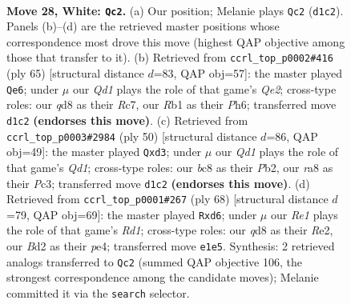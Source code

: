 \documentclass[11pt]{article}
\begin{document}
\clearpage

\begin{figure}[p]\centering
\begin{subfigure}{0.46\textwidth}\centering
\resizebox{\linewidth}{!}{%
\newchessgame
\chessboard[
  setfen={r1bq2k1/8/8/2p1pr1p/7P/p1P3P1/P2B4/1R1QR1K1 w - - 1 28},
  showmover=false,
  pgfstyle=straightmove, color=movearrow, markmove={d1-c2}
]}
\caption{}
\end{subfigure}\hfill
\begin{subfigure}{0.46\textwidth}\centering
\resizebox{\linewidth}{!}{%
\newchessgame
\chessboard[
  setfen={8/2r1qr1k/1p5p/4pp2/1PP1p3/1Q4P1/4P2P/2R2R1K b - - 1 33},
  showmover=false,
  pgfstyle=straightmove, color=movearrow, markmove={e7-e6}
]}
\caption{}
\end{subfigure}
\\[4pt]
\begin{subfigure}{0.46\textwidth}\centering
\resizebox{\linewidth}{!}{%
\newchessgame
\chessboard[
  setfen={r5k1/4q3/p1bp2p1/1p6/7P/P1PpB3/1P3P2/2RQK3 w - - 0 26},
  showmover=false,
  pgfstyle=straightmove, color=movearrow, markmove={d1-d3}
]}
\caption{}
\end{subfigure}\hfill
\begin{subfigure}{0.46\textwidth}\centering
\resizebox{\linewidth}{!}{%
\newchessgame
\chessboard[
  setfen={4qr1k/6p1/1rbp3p/8/2B1p3/7P/2Q1RPP1/3R2K1 w - - 0 35},
  showmover=false,
  pgfstyle=straightmove, color=movearrow, markmove={d1-d6}
]}
\caption{}
\end{subfigure}
\caption{\textbf{Move 28, White: \texttt{Qc2}.} (a) Our position; Melanie plays \texttt{Qc2} (\texttt{d1c2}). Panels (b)--(d) are the retrieved master positions whose correspondence most drove this move (highest QAP objective among those that transfer to it). (b) Retrieved from \texttt{ccrl\_top\_p0002\#416} (ply 65) [structural distance $d$=83, QAP obj=57]: the master played \texttt{Qe6}; under $\mu$ our \emph{Qd1} plays the role of that game's \emph{Qe2}; cross-type roles: our \emph{q}d8 as their \emph{R}c7, our \emph{R}b1 as their \emph{P}h6; transferred move \texttt{d1c2} \textbf{(endorses this move)}. (c) Retrieved from \texttt{ccrl\_top\_p0003\#2984} (ply 50) [structural distance $d$=86, QAP obj=49]: the master played \texttt{Qxd3}; under $\mu$ our \emph{Qd1} plays the role of that game's \emph{Qd1}; cross-type roles: our \emph{b}c8 as their \emph{P}b2, our \emph{r}a8 as their \emph{P}c3; transferred move \texttt{d1c2} \textbf{(endorses this move)}. (d) Retrieved from \texttt{ccrl\_top\_p0001\#267} (ply 68) [structural distance $d$=79, QAP obj=69]: the master played \texttt{Rxd6}; under $\mu$ our \emph{Re1} plays the role of that game's \emph{Rd1}; cross-type roles: our \emph{q}d8 as their \emph{R}e2, our \emph{B}d2 as their \emph{p}e4; transferred move \texttt{e1e5}. Synthesis: 2 retrieved analogs transferred to \texttt{Qc2} (summed QAP objective 106, the strongest correspondence among the candidate moves); Melanie committed it via the \texttt{search} selector.}
\label{fig:thought-m54}
\end{figure}
\end{document}
